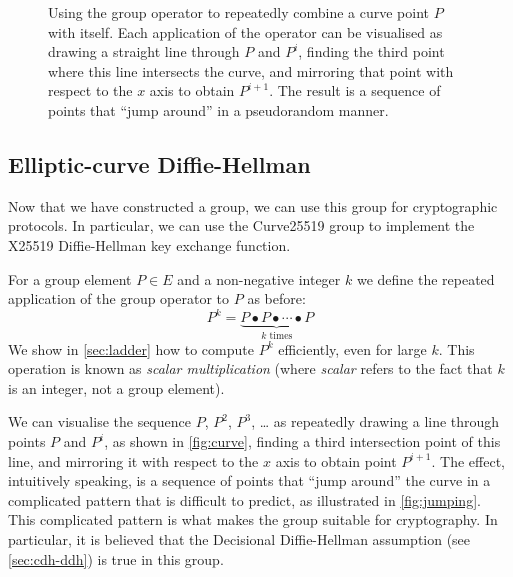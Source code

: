 \documentclass[manuscript]{acmart}
\begin{document}
\begin{figure}
\centering

\caption{Using the group operator to repeatedly combine a curve point $P$ with itself. Each application of the operator can be visualised as drawing a straight line through $P$ and $P^i$, finding the third point where this line intersects the curve, and mirroring that point with respect to the $x$ axis to obtain $P^{i+1}$. The result is a sequence of points that ``jump around'' in a pseudorandom manner.}
\label{fig:jumping}
\end{figure}

\subsection{Elliptic-curve Diffie-Hellman}\label{sec:ecdh}

Now that we have constructed a group, we can use this group for cryptographic protocols.
In particular, we can use the Curve25519 group to implement the X25519 Diffie-Hellman key exchange function.

For a group element $P \in E$ and a non-negative integer $k$ we define the repeated application of the group operator to $P$ as before:
\begin{equation}
P^k = \underbrace{P \bullet P \bullet \cdots \bullet P}_\text{$k$ times}
\end{equation}
We show in \autoref{sec:ladder} how to compute $P^k$ efficiently, even for large $k$.
This operation is known as \emph{scalar multiplication} (where \emph{scalar} refers to the fact that $k$ is an integer, not a group element).

We can visualise the sequence $P$, $P^2$, $P^3$, {\dots} as repeatedly drawing a line through points $P$ and $P^i$, as shown in \autoref{fig:curve}, finding a third intersection point of this line, and mirroring it with respect to the $x$ axis to obtain point $P^{i+1}$.
The effect, intuitively speaking, is a sequence of points that ``jump around'' the curve in a complicated pattern that is difficult to predict, as illustrated in \autoref{fig:jumping}.
This complicated pattern is what makes the group suitable for cryptography.
In particular, it is believed that the Decisional Diffie-Hellman assumption (see \autoref{sec:cdh-ddh}) is true in this group.
\end{document}
